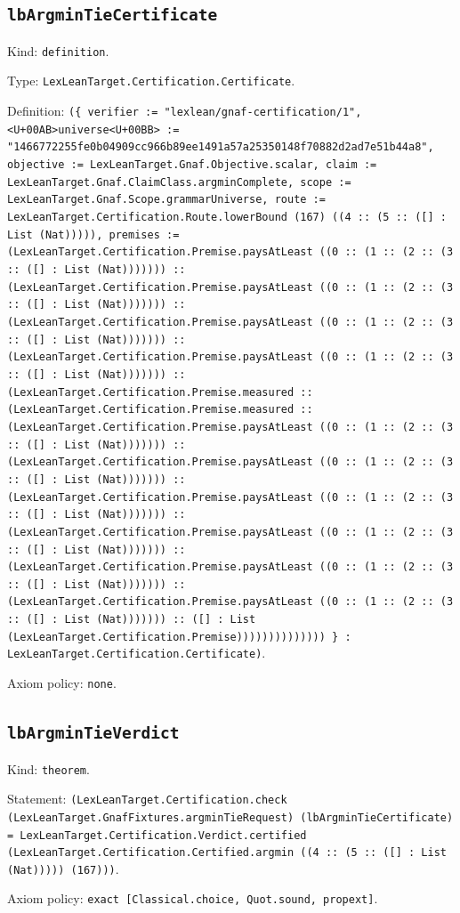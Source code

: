 \documentclass[11pt]{article}
\begin{document}
\subsection*{\texttt{lbArgminTieCertificate}}
\noindent Kind: \texttt{definition}.\par
\noindent Type: \texttt{LexLeanTarget.Certification.Certificate}.\par
\noindent Definition: \texttt{(\{ verifier := "lexlean/gnaf-certification/1", <U+00AB>universe<U+00BB> := "1466772255fe0b04909cc966b89ee1491a57a25350148f70882d2ad7e51b44a8", objective := LexLeanTarget.Gnaf.Objective.scalar, claim := LexLeanTarget.Gnaf.ClaimClass.argminComplete, scope := LexLeanTarget.Gnaf.Scope.grammarUniverse, route := LexLeanTarget.Certification.Route.lowerBound (167) ((4 :: (5 :: ([] : List (Nat))))), premises := (LexLeanTarget.Certification.Premise.paysAtLeast ((0 :: (1 :: (2 :: (3 :: ([] : List (Nat))))))) :: (LexLeanTarget.Certification.Premise.paysAtLeast ((0 :: (1 :: (2 :: (3 :: ([] : List (Nat))))))) :: (LexLeanTarget.Certification.Premise.paysAtLeast ((0 :: (1 :: (2 :: (3 :: ([] : List (Nat))))))) :: (LexLeanTarget.Certification.Premise.paysAtLeast ((0 :: (1 :: (2 :: (3 :: ([] : List (Nat))))))) :: (LexLeanTarget.Certification.Premise.measured :: (LexLeanTarget.Certification.Premise.measured :: (LexLeanTarget.Certification.Premise.paysAtLeast ((0 :: (1 :: (2 :: (3 :: ([] : List (Nat))))))) :: (LexLeanTarget.Certification.Premise.paysAtLeast ((0 :: (1 :: (2 :: (3 :: ([] : List (Nat))))))) :: (LexLeanTarget.Certification.Premise.paysAtLeast ((0 :: (1 :: (2 :: (3 :: ([] : List (Nat))))))) :: (LexLeanTarget.Certification.Premise.paysAtLeast ((0 :: (1 :: (2 :: (3 :: ([] : List (Nat))))))) :: (LexLeanTarget.Certification.Premise.paysAtLeast ((0 :: (1 :: (2 :: (3 :: ([] : List (Nat))))))) :: (LexLeanTarget.Certification.Premise.paysAtLeast ((0 :: (1 :: (2 :: (3 :: ([] : List (Nat))))))) :: ([] : List (LexLeanTarget.Certification.Premise)))))))))))))) \} : LexLeanTarget.Certification.Certificate)}.\par
\noindent Axiom policy: \texttt{none}.\par
\subsection*{\texttt{lbArgminTieVerdict}}
\noindent Kind: \texttt{theorem}.\par
\noindent Statement: \texttt{(LexLeanTarget.Certification.check (LexLeanTarget.GnafFixtures.argminTieRequest) (lbArgminTieCertificate) = LexLeanTarget.Certification.Verdict.certified (LexLeanTarget.Certification.Certified.argmin ((4 :: (5 :: ([] : List (Nat))))) (167)))}.\par
\noindent Axiom policy: \texttt{exact [Classical.choice, Quot.sound, propext]}.\par
\end{document}
